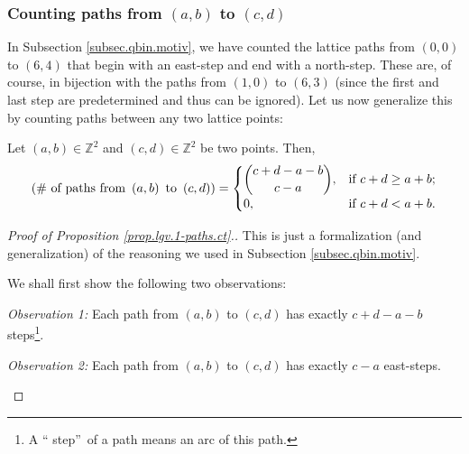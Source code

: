 \begin{definition}
\subsubsection{Counting paths from $\left(  a,b\right)  $ to $\left(
c,d\right)  $}

In Subsection \ref{subsec.qbin.motiv}, we have counted the lattice paths from
$\left(  0,0\right)  $ to $\left(  6,4\right)  $ that begin with an east-step
and end with a north-step. These are, of course, in bijection with the paths
from $\left(  1,0\right)  $ to $\left(  6,3\right)  $ (since the first and
last step are predetermined and thus can be ignored). Let us now generalize
this by counting paths between any two lattice points:

\begin{proposition}
\label{prop.lgv.1-paths.ct}Let $\left(  a,b\right)  \in\mathbb{Z}^{2}$ and
$\left(  c,d\right)  \in\mathbb{Z}^{2}$ be two points. Then,%
\[
\left(  \text{\# of paths from }\left(  a,b\right)  \text{ to }\left(
c,d\right)  \right)  =%
\begin{cases}
\dbinom{c+d-a-b}{c-a}, & \text{if }c+d\geq a+b;\\
0, & \text{if }c+d<a+b.
\end{cases}
\]

\end{proposition}

\begin{proof}
[Proof of Proposition \ref{prop.lgv.1-paths.ct}.]This is just a formalization
(and generalization) of the reasoning we used in Subsection
\ref{subsec.qbin.motiv}.

We shall first show the following two observations:

\begin{statement}
\textit{Observation 1:} Each path from $\left(  a,b\right)  $ to $\left(
c,d\right)  $ has exactly $c+d-a-b$ steps\footnote{A \textquotedblleft
step\textquotedblright\ of a path means an arc of this path.}.
\end{statement}

\begin{statement}
\textit{Observation 2:} Each path from $\left(  a,b\right)  $ to $\left(
c,d\right)  $ has exactly $c-a$ east-steps.
\end{statement}


\end{proof}
\end{definition}
